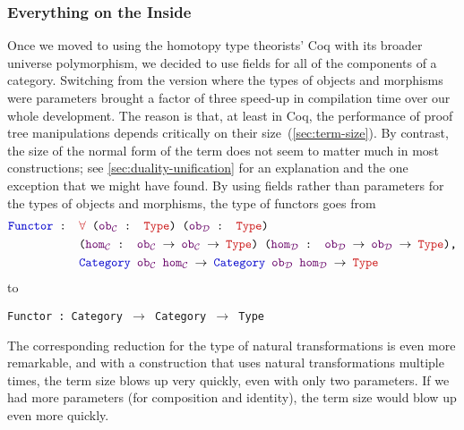 \documentclass[runningheads]{llncs}
\newcommand{\cat}[1]{\ensuremath{\mathcal{#1}}}
\newcommand{\colortext}[2]{\textcolor{#1}{#2}}
\newcommand{\coqdockw}[1]{\texttt {\colortext{kwred}{#1}}}
\newcommand{\coqdocvar}[1]{\colortext{varpurple}{#1}}
\newcommand{\coqdocind}[1]{\texttt{\colortext{indblue}{#1}}}%
\newcommand{\coqdocvariable}[1]{\coqdocvar{#1}}
\newcommand{\coqdocrecord}[1]{\coqdocind{#1}}
\begin{document}
    \subsubsection{Everything on the Inside}
      Once we moved to using the homotopy type theorists' Coq with its broader universe polymorphism, we decided to use fields for all of the components of a category.  Switching from the version where the types of objects and morphisms were parameters brought a factor of three speed-up in compilation time over our whole development.  The reason is that, at least in Coq, the performance of proof tree manipulations depends critically on their size~(\autoref{sec:term-size}).  By contrast, the size of the normal form of the term does not seem to matter much in most constructions; see \autoref{sec:duality-unification} for an explanation and the one exception that we might have found.  By using fields rather than parameters for the types of objects and morphisms, the type of functors goes from
      \begin{align*}
        \texttt{\coqdocrecord{Functor} : } & \texttt{\coqdockw{$\forall$} (\coqdocvariable{ob$_{\cat C}$} : \coqdockw{Type}) (\coqdocvariable{ob$_{\cat D}$} : \coqdockw{Type})} \\
        & \texttt{(\coqdocvariable{hom$_{\cat C}$} : \coqdocvariable{ob$_{\cat C}$} $\to$ \coqdocvariable{ob$_{\cat C}$} $\to$ \coqdockw{Type}) (\coqdocvariable{hom$_{\cat D}$} : \coqdocvariable{ob$_{\cat D}$} $\to$ \coqdocvariable{ob$_{\cat D}$} $\to$ \coqdockw{Type}),} \\
        & \texttt{\coqdocrecord{Category} \coqdocvariable{ob$_{\cat C}$} \coqdocvariable{hom$_{\cat C}$} $\to$ \coqdocrecord{Category} \coqdocvariable{ob$_{\cat D}$} \coqdocvariable{hom$_{\cat D}$} $\to$ \coqdockw{Type}}
      \end{align*}
      \noindent to
      \begin{center}
        \texttt{\coqdocrecord{Functor} : \coqdocrecord{Category} $\to$ \coqdocrecord{Category} $\to$ \coqdockw{Type}}
      \end{center}
      The corresponding reduction for the type of natural transformations is even more remarkable, and with a construction that uses natural transformations multiple times, the term size blows up very quickly, even with only two parameters.  If we had more parameters (for composition and identity), the term size would blow up even more quickly.
\end{document}

